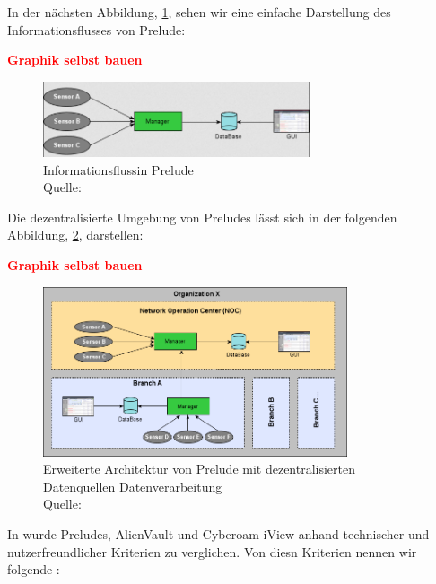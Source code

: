 \newpage
In der nächsten Abbildung, \ref{fig:Prelude}, sehen wir eine einfache Darstellung des Informationsflusses von Prelude:

\textbf{\textcolor{red}{Graphik selbst bauen}}

\begin{figure}[H]
   \centering
   \includegraphics[width=0.7\textwidth]{assets/2_p4.png}
   \caption[Informationsfluss in Prelude]
   {Informationsflussin Prelude \\Quelle: \citep{Prelude_MU} }
   \label{fig:Prelude}
   \centering
\end{figure}

Die dezentralisierte Umgebung von Preludes lässt sich in der folgenden Abbildung, \ref{fig:Prelude_erweitert}, darstellen:


\textbf{\textcolor{red}{Graphik selbst bauen}}

\begin{figure}[H]
   \centering
   \includegraphics[width=0.8\textwidth]{assets/2_p5.png}
   \caption[Erweiterte Architektur von Prelude mit dezentralisierten Datenquellen und Datenverarbeitung]
   {Erweiterte Architektur von Prelude mit dezentralisierten Datenquellen Datenverarbeitung\\Quelle: \citep{Prelude_MU}}
   \label{fig:Prelude_erweitert}
   \centering
\end{figure}

\newpage
In \citep{Grammatikis_Prelude} wurde Preludes, AlienVault und Cyberoam iView anhand technischer und nutzerfreundlicher Kriterien zu verglichen. Von diesn Kriterien nennen wir folgende \citep{Grammatikis_Prelude}: 

